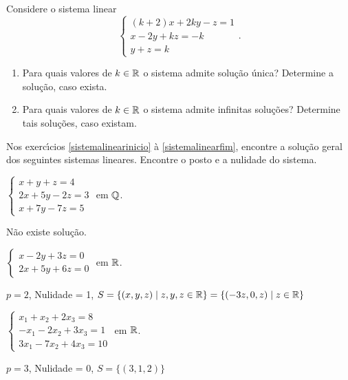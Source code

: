 \documentclass[12pt]{exam}
\begin{document}
\begin{exercicio}
  Considere o sistema linear
  \[
    \begin{cases}
      (k + 2)x + 2ky - z = 1\\
      x - 2y + kz = -k\\
      y + z = k
    \end{cases}.
  \]
  \begin{enumerate}[label={\alph*})]
    \item Para quais valores de $k \in \mathbb{R}$ o sistema admite solu\c{c}\~ao \'unica? Determine a solu\c{c}\~ao, caso exista.
    \item Para quais valores de $k \in \mathbb{R}$ o sistema admite infinitas solu\c{c}\~oes? Determine tais solu\c{c}\~oes, caso existam.
  \end{enumerate}
\end{exercicio}

Nos exerc{\'\i}cios \ref{sistemalinearinicio} \`a \ref{sistemalinearfim}, encontre a solu\c{c}\~ao geral dos seguintes sistemas lineares. Encontre o posto e a nulidade do sistema.
\begin{exercicio}\label{sistemalinearinicio}
  $
    \begin{cases}
      x + y + z = 4\\
      2x + 5y - 2z = 3\\
      x + 7y - 7z = 5
    \end{cases}
  $
  em $\mathbb{Q}$.
  \begin{solucao}
    N\~ao existe solu\c{c}\~ao.
  \end{solucao}
\end{exercicio}

\begin{exercicio}
  $
    \begin{cases}
      x - 2y + 3z = 0\\
      2x + 5y + 6z = 0
    \end{cases}
  $
  em $\mathbb{R}$.
  \begin{solucao}
    $p = 2$, Nulidade = 1, $S = \{(x, y, z) \mid z, y, z \in \mathbb{R}\} = \{(-3z, 0, z) \mid z \in \mathbb{R}\}$
  \end{solucao}
\end{exercicio}

\begin{exercicio}
  $
    \begin{cases}
      x_1 + x_2 + 2x_3 = 8\\
      -x_1 - 2x_2 + 3x_3 = 1\\
      3x_1 - 7x_2 + 4x_3 = 10
    \end{cases}
  $
  em $\mathbb{R}$.
  \begin{solucao}
    $p = 3$, Nulidade = 0, $S = \{(3, 1, 2)\}$
  \end{solucao}
\end{exercicio}
\end{document}
